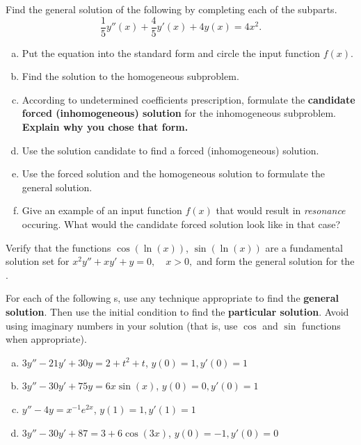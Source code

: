   \begin{question}
    Find the general solution of the following \ode{} by completing each of the subparts.
    \[
      \frac{1}{5}y''(x) + \frac{4}{5} y'(x) + 4 y(x) =  4x^{2}.
    \]

    \begin{enumerate}[(a)]
      \item Put the equation into the standard form and circle the input function \(f(x)\).
      \item Find the solution to the homogeneous subproblem.
      \item According to undetermined coefficients prescription, formulate the \textbf{candidate forced (inhomogeneous) solution} for the inhomogeneous subproblem. \textbf{Explain why you chose that form.}
      \item Use the solution candidate to find a forced (inhomogeneous) solution.
      \item Use the forced solution and the homogeneous solution to formulate the general solution.
      \item Give an example of an input function \(f(x)\) that would result in \emph{resonance} occuring. What would the candidate forced solution look like in that case?
    \end{enumerate}
  \end{question}


  \begin{question}
    Verify that the functions \(\cos(\ln(x))\), \(\sin(\ln(x))\) are a fundamental solution set for \( x^{2} y'' + xy' + y = 0, \quad x > 0,\)
    and form the general solution for the \ode{}.
  \end{question}


  \begin{question}
    For each of the following \ode{}s, use any technique appropriate  to find the \textbf{general solution}. Then  use the initial condition to find the \textbf{particular solution}.
    Avoid using imaginary numbers in your solution (that is, use \(\cos\) and \(\sin\) functions when appropriate).
    \begin{enumerate}[(a)]
      \item \( 3y'' - 21y' + 30y = 2 + t^{2} + t\), \qquad \(y(0) = 1, y'(0) = 1 \)
      \item \( 3y'' - 30y' + 75y = 6 x \sin(x)\), \qquad  \(y(0) = 0, y'(0) = 1 \)
      \item \( y'' - 4 y = x^{-1}e^{2x} \), \qquad  \(y(1) = 1, y'(1) = 1 \)
      \item \( 3y'' - 30y' + 87 = 3 + 6\cos(3x)\), \qquad  \(y(0) = -1, y'(0) = 0 \)
    \end{enumerate}
  \end{question}


